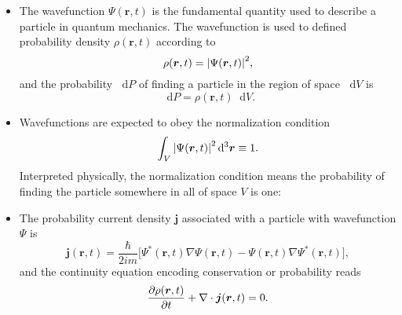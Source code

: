 \documentclass[11pt, a4paper]{article}
\newcommand{\diff}{\mathop{}\!\mathrm{d}} %
\newcommand{\dr}{\diff^{3} \r}  %
\renewcommand{\div}{\nabla \cdot}
\renewcommand{\grad}{\nabla}
\renewcommand{\vec}[1]{\bm{#1}}  %
\renewcommand{\r}{\vec{r}}  %
\renewcommand{\P}{\Psi}  %
\begin{document}
\begin{itemize}
    \item The wavefunction $ \Psi(\r, t) $ is the fundamental quantity used to describe a particle in quantum mechanics. The wavefunction is used to defined probability density $ \rho(\r, t) $ according to
	\begin{equation*}
		\rho (\r, t) = \abs{\P(\r, t)}^{2},
	\end{equation*}
	and the probability $ \diff P $ of finding a particle in the region of space $ \diff V $ is
	\begin{equation*}
		\diff P = \rho(\r, t) \diff V.
	\end{equation*}

    \item Wavefunctions are expected to obey the normalization condition
	\begin{equation*}
		\int_{V} \abs{\P(\r, t)}^{2}\dr \equiv 1.
	\end{equation*}
	Interpreted physically, the normalization condition means the probability of finding the particle somewhere in all of space $ V $ is one:
	
    \item The probability current density $ \vec{j} $ associated with a particle with wavefunction $ \Psi $ is
    \begin{equation*}
        \vec{j}(\r, t) = \frac{\hbar}{2im}\big[ \Psi^{*}(\r, t)\grad \P(\r, t) - \P(\r, t)\grad \P^{*}(\r, t) \big],
    \end{equation*}
    and the continuity equation encoding conservation or probability reads
    \begin{equation*}
        \pdv{\rho(\r, t)}{t} + \div \vec{j}(\r, t) = 0.
    \end{equation*}
    
\end{itemize} 
    
\end{document}
